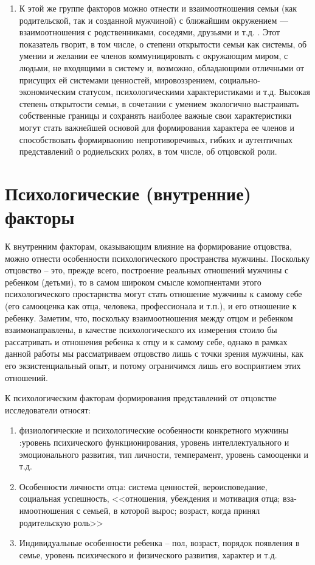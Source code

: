 \documentclass{../../common/thesisbyxetex}
\begin{document}
\begin{enumerate}
\item К этой же группе факторов можно отнести и взаимоотношения семьи (как родительской, так и
созданной мужчиной) с ближайшим окружением --- взаимоотношения с родственниками, соседями, друзьями
и т.д. \cite[40]{otage}. Этот показатель гворит, в том числе, о степени открытости семьи как
системы, об умении и желании ее членов коммуницировать с окружающим миром, с людьми, не входящими в
систему и, возможно, обладающими отличными от присущих ей системами ценностей, мировоззрением,
социально-экономическим статусом, психологическими характеристиками и т.д. Высокая степень
открытости семьи, в сочетании с умением экологично выстраивать собственные границы и сохранять
наиболее важные свои характеристики могут стать важнейшей основой для формирования характера
ее членов и способствовать формирваонию непротиворечивых, гибких и аутентичных представлений о
родиельских ролях, в том числе, об отцовской роли.

\end{enumerate}




\section{Психологические (внутренние) факторы}

К внутренним факторам, оказывающим влияние на формирование отцовства, можно отнести  особенности
психологического пространства мужчины. Поскольку отцовство -- это, прежде всего, построение
реальных отношений мужчины с ребенком (детьми), то в самом широком смысле комопнентами этого
психологического простарнства могут стать отношение мужчины к самому себе (его самооценка как отца,
человека, профессионала и т.п.), и его отношение к ребенку. Заметим, что, поскольку взаимоотношения
между отцом и ребенком взаимонаправлены, в качестве психологического их измерения стоило бы
рассатривать и отношения ребенка к отцу и к самому себе, однако в рамках данной работы мы
рассматриваем отцовство лишь с точки зрения мужчины, как его экзистенциальный опыт, и потому
ограничимся лишь его восприятием этих отношений.

К психологическим факторам формирования представлений от отцовстве исследователи относят:

\begin{enumerate}
\item  физиологические и психологические особенности конкретного мужчины :уровень психического
функционирования,
уровень интеллектуального и эмоционального развития, тип личности, темперамент, уровень самооценки
и т.д.

\item Особенности личности отца: система ценностей, вероисповедание, социальная
успешность, <<отношения, убеждения и мотивация отца; вза-
имоотношения с семьей, в которой вырос; возраст,
когда принял родительскую роль>> \cite[40]{otage}

\item Индивидуальные особенности ребенка -- пол, возраст, порядок появления в семье, уровень
психического и физического развития, характер и т.д.

\end{enumerate}
\end{document}
